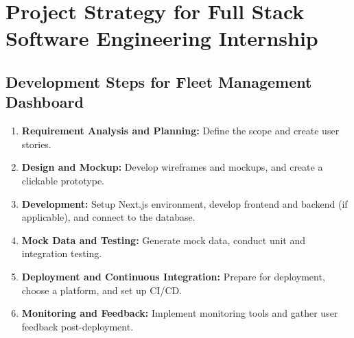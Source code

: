 \section*{Project Strategy for Full Stack Software Engineering Internship}
\subsection*{Development Steps for Fleet Management Dashboard}

\begin{enumerate}
    \item \textbf{Requirement Analysis and Planning:} Define the scope and create user stories.
    \item \textbf{Design and Mockup:} Develop wireframes and mockups, and create a clickable prototype.
    \item \textbf{Development:} Setup Next.js environment, develop frontend and backend (if applicable), and connect to the database.
    \item \textbf{Mock Data and Testing:} Generate mock data, conduct unit and integration testing.
    \item \textbf{Deployment and Continuous Integration:} Prepare for deployment, choose a platform, and set up CI/CD.
    \item \textbf{Monitoring and Feedback:} Implement monitoring tools and gather user feedback post-deployment.
\end{enumerate}

